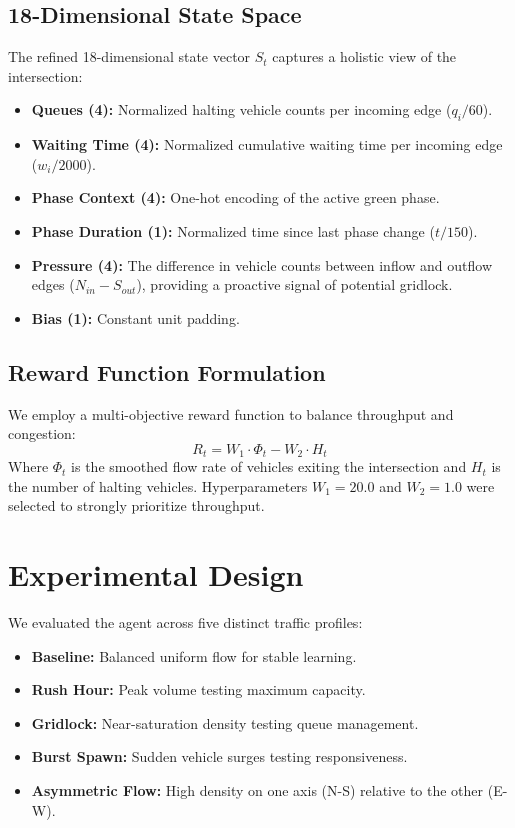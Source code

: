 \documentclass[conference]{IEEEtran}
\begin{document}
\subsection{18-Dimensional State Space}
The refined 18-dimensional state vector $S_t$ captures a holistic view of the intersection:
\begin{itemize}
    \item \textbf{Queues (4):} Normalized halting vehicle counts per incoming edge ($q_i/60$).
    \item \textbf{Waiting Time (4):} Normalized cumulative waiting time per incoming edge ($w_i/2000$).
    \item \textbf{Phase Context (4):} One-hot encoding of the active green phase.
    \item \textbf{Phase Duration (1):} Normalized time since last phase change ($t/150$).
    \item \textbf{Pressure (4):} The difference in vehicle counts between inflow and outflow edges ($N_{in} - S_{out}$), providing a proactive signal of potential gridlock.
    \item \textbf{Bias (1):} Constant unit padding.
\end{itemize}

\subsection{Reward Function Formulation}
We employ a multi-objective reward function to balance throughput and congestion:
\begin{equation}
R_t = W_1 \cdot \Phi_{t} - W_2 \cdot H_t
\end{equation}
Where $\Phi_{t}$ is the smoothed flow rate of vehicles exiting the intersection and $H_t$ is the number of halting vehicles. Hyperparameters $W_1 = 20.0$ and $W_2 = 1.0$ were selected to strongly prioritize throughput.

\section{Experimental Design}
We evaluated the agent across five distinct traffic profiles:
\begin{itemize}
    \item \textbf{Baseline:} Balanced uniform flow for stable learning.
    \item \textbf{Rush Hour:} Peak volume testing maximum capacity.
    \item \textbf{Gridlock:} Near-saturation density testing queue management.
    \item \textbf{Burst Spawn:} Sudden vehicle surges testing responsiveness.
    \item \textbf{Asymmetric Flow:} High density on one axis (N-S) relative to the other (E-W).
\end{itemize}
\end{document}
